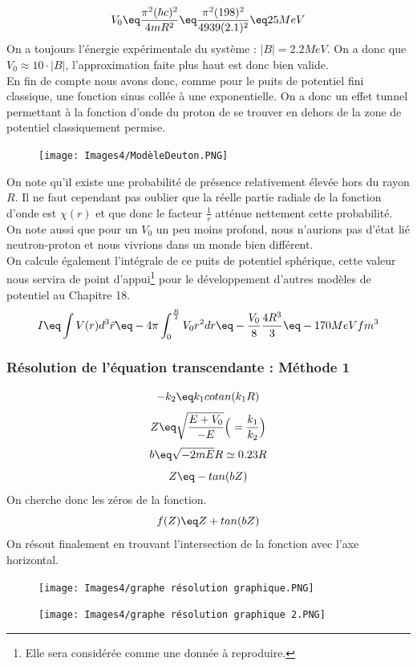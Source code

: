 \begin{equation*}
    V_0 \eq \frac{\pi^2(\hbar c)^2}{4mR^2} \eq \frac{\pi^2 (198)^2}{4 939 (2.1)^2}
    \eq 25MeV
\end{equation*}
On a toujours l'énergie expérimentale du système : $|B| = 2.2MeV$. On a donc que $V_0 \approx 10\cdot|B|$, l'approximation faite plus haut est donc bien valide.\\
En fin de compte nous avons donc, comme pour le puits de potentiel fini classique, une fonction sinus collée à une exponentielle. On a donc un effet tunnel permettant à la fonction d'onde du proton de se trouver en dehors de la zone de potentiel classiquement permise.
\begin{figure}[H]
    \centering
    \texttt{[image: Images4/ModèleDeuton.PNG]}
\end{figure}
On note qu'il existe une probabilité de présence relativement élevée hors du rayon $R$. Il ne faut cependant pas oublier que la réelle partie radiale de la fonction d'onde est $\chi(r)$ et que donc le facteur $\frac{1}{r}$ atténue nettement cette probabilité.\\
On note aussi que pour un $V_0$ un peu moins profond, nous n'aurions pas d'état lié neutron-proton et nous vivrions dans un monde bien différent.\\

On calcule également l'intégrale de ce puits de potentiel sphérique, cette valeur nous servira de point d'appui\footnote{Elle sera considérée comme une donnée à reproduire.} pour le développement d'autres modèles de potentiel au Chapitre 18.
\begin{equation*}
    I 
    \eq \int V(r) d^3\vec{r} 
    \eq -4\pi\int_0^{\frac{R}{2}} V_0 r^2 dr 
    \eq -\frac{V_0}{8}\frac{4R^3}{3}
    \eq -170MeVfm^3
\end{equation*}
\subsubsection{Résolution de l'équation transcendante : Méthode 1}
\begin{equation*}
    -k_2 \eq k_1 cotan(k_1R)
\end{equation*}
\begin{equation*}
    Z \eq \sqrt{\frac{E+V_0}{-E}} \Big(= \frac{k_1}{k_2} \Big)
\end{equation*}
\begin{equation*}
    b \eq \sqrt{-2mE}R \simeq 0.23 R
\end{equation*}
\begin{equation*}
    Z \eq -tan(bZ)
\end{equation*}
On cherche donc les zéros de la fonction. 
\begin{equation*}
    f(Z) \eq Z + tan(bZ)
\end{equation*}
On résout finalement en trouvant l'intersection de la fonction avec l'axe horizontal.
\begin{figure}[H]
    \centering
    \texttt{[image: Images4/graphe résolution graphique.PNG]}
\end{figure}
\begin{figure}[H]
    \centering
    \texttt{[image: Images4/graphe résolution graphique 2.PNG]}
\end{figure}
